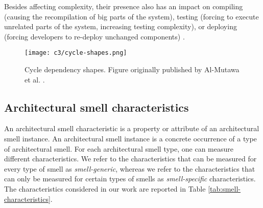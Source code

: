 Besides affecting complexity, their presence also has an impact on compiling (causing the recompilation of big parts of the system), testing (forcing to execute unrelated parts of the system, increasing testing complexity), or deploying (forcing developers to re-deploy unchanged components) \cite{Lippert2006}.

\begin{figure}
    \centering
    \texttt{[image: c3/cycle-shapes.png]}
    \caption{Cycle dependency shapes. Figure originally published by Al-Mutawa et al. \cite{AlMutawa2014}.}
    \label{c3:fig:cycle-dep} 
\end{figure}

\subsection{Architectural smell characteristics}\label{c3:sec:smell-characteristics}
An architectural smell characteristic is a property or attribute of an architectural smell instance. 
An architectural smell instance is a concrete occurrence of a type of architectural smell.
For each architectural smell type, one can measure different characteristics. We refer to the characteristics that can be measured for every type of smell as \emph{smell-generic}, whereas we refer to the characteristics that can only be measured for certain types of smells as \emph{smell-specific} characteristics.
The characteristics considered in our work are reported in Table \ref{tab:smell-characteristics}.

